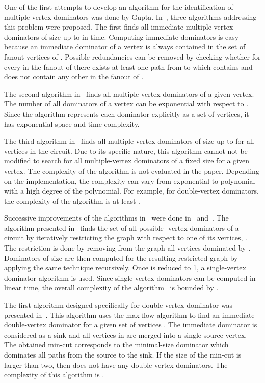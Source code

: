 \documentclass{llncs}
\begin{document}
One of the first attempts to develop an algorithm for the
identification of multiple-vertex dominators was done by
Gupta. In~\cite{gupta}, three algorithms addressing this
problem were proposed. The first finds all immediate multiple-vertex dominators of
size up to  in  time. Computing immediate dominators is
easy because an immediate dominator of a vertex  is always
contained in the set of fanout vertices of . Possible redundancies
can be removed by checking whether for every  in the fanout of
 there exists at least one path from  to  which contains
 and does not contain any other  in the fanout of .

The second algorithm in~\cite{gupta} finds all multiple-vertex dominators of
a given vertex. The number of all dominators of a vertex can be
exponential with respect to . Since the algorithm represents each
dominator explicitly as a set of vertices, it has exponential space
and time complexity.

The third algorithm in~\cite{gupta} finds all multiple-vertex dominators of
size up to  for all vertices in the circuit. Due to its specific
nature, this algorithm cannot not be modified to search for all
multiple-vertex dominators of a fixed size for a given vertex.
The complexity of the algorithm is not evaluated in the
paper. Depending on the implementation, the complexity can vary from
exponential to polynomial with a high degree of the polynomial.
For example, for double-vertex dominators, the complexity of the
algorithm is at least .

Successive improvements of the algorithms in~\cite{gupta} were done in~\cite{KrD05a,KrD05b,Du04} and~\cite{DuTM04}.
The algorithm presented in~\cite{DuTM04} finds the set of all
possible -vertex dominators of a circuit by
iteratively restricting the graph with respect to one of its vertices, . The restriction is done by removing from 
the graph all vertices dominated by . Dominators of size  are then computed for the resulting
restricted graph by applying the same
technique recursively.  Once  is reduced to 1, a single-vertex
dominator algorithm is used.  Since single-vertex dominators can be
computed in linear time, the overall complexity of the
algorithm~\cite{DuTM04} is bounded by . 

The first algorithm designed specifically for
double-vertex dominator was presented in~\cite{TeD05b}. This algorithm
uses the max-flow algorithm to find an immediate double-vertex dominator 
for a given set of vertices . The immediate dominator is
considered as a sink and all vertices in  are merged into a single
source vertex.  The obtained min-cut corresponds to the minimal-size 
dominator which dominates all paths from the source to the sink.  
If the size of the min-cut is larger than two, then  does not
have any double-vertex dominators. The complexity of this algorithm 
is .
\end{document}
